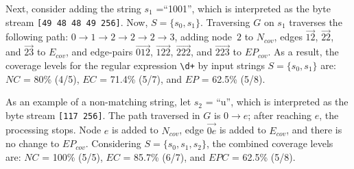 
Next, consider adding the string $s_1$ =``1001'', which is interpreted as the byte stream {\tt [49 48 48 49 256]}. Now, $S = \{s_0, s_1\}$.
Traversing $G$ on $s_1$ traverses the following path: $0 \rightarrow 1 \rightarrow 2 \rightarrow 2 \rightarrow 2 \rightarrow 3$, adding node~$2$ to $N_{cov}$, edges  $\overrightarrow{12}$, $\overrightarrow{22}$, and $\overrightarrow{23}$ to $E_{cov}$, and edge-pairs $\overrightarrow{012}$, $\overrightarrow{122}$, $\overrightarrow{222}$, and $\overrightarrow{223}$ to $EP_{cov}$. 
As a result, the coverage levels for the regular expression \verb!\d+! by input strings $S = \{s_0, s_1\}$ are: 
$NC$ = 80\% (4/5), $EC$ = 71.4\% (5/7), and $EP$ = 62.5\% (5/8).

As an example of a non-matching string, let $s_2$ = ``u'', which is interpreted as the byte stream {\tt [117 256]}. 
The path traversed in $G$ is $0 \rightarrow e$; after reaching $e$, the processing stops. 
Node $e$ is added to $N_{cov}$, edge $\overrightarrow{0e}$ is added to $E_{cov}$, and there is no change to $EP_{cov}$. 
Considering $S = \{s_0, s_1, s_2\}$, the combined coverage levels are: $NC$ = 100\% (5/5), $EC$ = 85.7\% (6/7), and $EPC$ =  62.5\% (5/8). %


